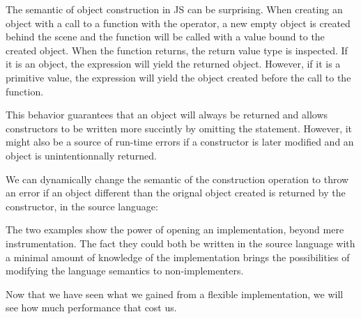 The semantic of object construction in JS can be surprising. When creating an
object with a call to a function with the  operator, a new empty object
is created behind the scene and the function will be called with a 
value bound to the created object. When the function returns, the return value type 
is inspected. If it is an object, the  expression will yield the
returned object. However, if it is a primitive value, the  expression
will yield the object created before the call to the function.

This behavior guarantees that an object will always be returned and allows
constructors to be written more succintly by omitting the 
statement. However, it might also be a source of run-time errors if a
constructor is later modified and an object is unintentionnally returned.

We can dynamically change the semantic of the construction operation to throw
an error if an object different than the orignal object created is returned by
the constructor, in the source language:


The two examples show the power of opening an implementation, beyond mere
instrumentation. The fact they could both be written in the source language
with a minimal amount of knowledge of the implementation brings the
possibilities of modifying the language semantics to non-implementers.

Now that we have seen what we gained from a flexible implementation, we will
see how much performance that cost us.
